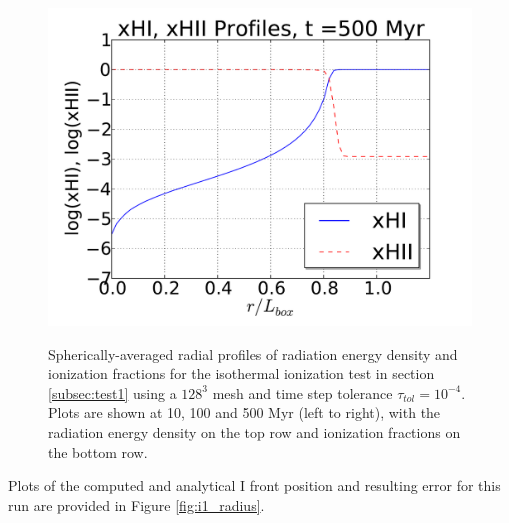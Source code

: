\begin{figure}[t]
{  \includegraphics[scale=0.3, trim=1.0cm 0.5cm 1.0cm 0.5cm]{i1-profiles_500Myr.pdf}
  \hfill}
  \caption{Spherically-averaged radial profiles of radiation energy
    density and ionization fractions for the isothermal ionization
    test in section \ref{subsec:test1} using a $128^3$ mesh and
    time step tolerance $\tau_{tol} =10^{-4}$.  Plots are shown at 10, 100
    and 500 Myr (left to right), with the radiation energy density on
    the top row and ionization fractions on the bottom row.}
  \label{fig:i1_results}
\end{figure}
Plots of the computed and analytical I front position and resulting
error for this run are provided in Figure \ref{fig:i1_radius}.
